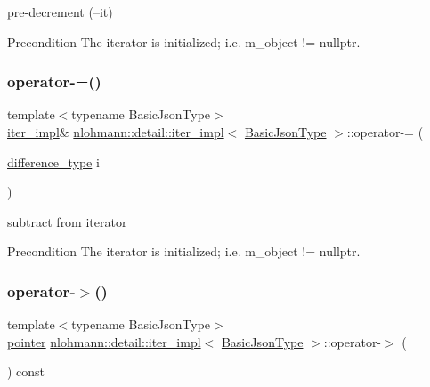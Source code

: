 pre-\/decrement (--it) 

\begin{DoxyPrecond}{Precondition}
The iterator is initialized; i.\+e. {\ttfamily m\+\_\+object != nullptr}. 
\end{DoxyPrecond}
\mbox{\label{classnlohmann_1_1detail_1_1iter__impl_abcc9d51bc52f2e8483bbe4018f05e978}} 
\subsubsection{\texorpdfstring{operator-\/=()}{operator-=()}}
{\footnotesize\ttfamily template$<$typename Basic\+Json\+Type$>$ \\
\hyperlink{classnlohmann_1_1detail_1_1iter__impl}{iter\+\_\+impl}\& \hyperlink{classnlohmann_1_1detail_1_1iter__impl}{nlohmann\+::detail\+::iter\+\_\+impl}$<$ \hyperlink{classnlohmann_1_1detail_1_1iter__impl_abf18f18793f84b0222aebb5a2a87da7a}{Basic\+Json\+Type} $>$\+::operator-\/= (\begin{DoxyParamCaption}\item[{\hyperlink{classnlohmann_1_1detail_1_1iter__impl_a2f7ea9f7022850809c60fc3263775840}{difference\+\_\+type}}]{i }\end{DoxyParamCaption})\hspace{0.3cm}{\ttfamily [inline]}}



subtract from iterator 

\begin{DoxyPrecond}{Precondition}
The iterator is initialized; i.\+e. {\ttfamily m\+\_\+object != nullptr}. 
\end{DoxyPrecond}
\mbox{\label{classnlohmann_1_1detail_1_1iter__impl_a6da3d2b34528aff328f3dcb513076dec}} 
\subsubsection{\texorpdfstring{operator-\/$>$()}{operator->()}}
{\footnotesize\ttfamily template$<$typename Basic\+Json\+Type$>$ \\
\hyperlink{classnlohmann_1_1detail_1_1iter__impl_a69e52f890ce8c556fd68ce109e24b360}{pointer} \hyperlink{classnlohmann_1_1detail_1_1iter__impl}{nlohmann\+::detail\+::iter\+\_\+impl}$<$ \hyperlink{classnlohmann_1_1detail_1_1iter__impl_abf18f18793f84b0222aebb5a2a87da7a}{Basic\+Json\+Type} $>$\+::operator-\/$>$ (\begin{DoxyParamCaption}{ }\end{DoxyParamCaption}) const\hspace{0.3cm}{\ttfamily [inline]}}



